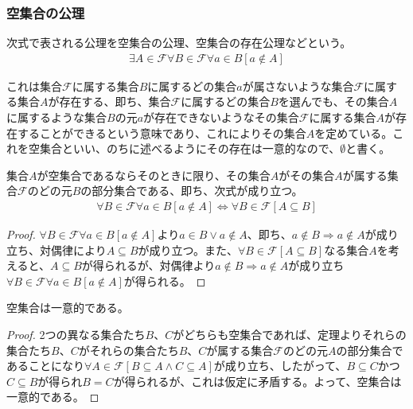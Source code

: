 \documentclass[a4paper]{jsarticle}
\begin{document}
\subsubsection{空集合の公理}%
\begin{axs}
次式で表される公理を空集合の公理、空集合の存在公理などという。
\begin{align*}
\exists A\in \mathcal{F}\forall B\in \mathcal{F} \forall a \in B[ a \notin A]
\end{align*}
\end{axs}
これは集合$\mathcal{F}$に属する集合$B$に属するどの集合$a$が属さないような集合$\mathcal{F}$に属する集合$A$が存在する、即ち、集合$\mathcal{F}$に属するどの集合$B$を選んでも、その集合$A$に属するような集合$B$の元$a$が存在できないようなその集合$\mathcal{F}$に属する集合$A$が存在することができるという意味であり、これによりその集合$A$を定めている。これを空集合といい、のちに述べるようにその存在は一意的なので、$\emptyset$と書く。
\begin{thm}
\label{1.2.1.1}
集合$A$が空集合であるならそのときに限り、その集合$A$がその集合$A$が属する集合$\mathcal{F}$のどの元$B$の部分集合である、即ち、次式が成り立つ。
\begin{align*}
\forall B\in \mathcal{F} \forall a \in B[ a \notin A] \Leftrightarrow \forall B\in \mathcal{F}[ A \subseteq B]
\end{align*}
\end{thm}
\begin{proof}
$\forall B\in \mathcal{F} \forall a \in B[ a \notin A]$より$a \in B \vee a \notin A$、即ち、$a \notin B \Rightarrow a \notin A$が成り立ち、対偶律により$A \subseteq B$が成り立つ。また、$\forall B\in \mathcal{F}[ A \subseteq B]$なる集合$A$を考えると、$A \subseteq B$が得られるが、対偶律より$a \notin B \Rightarrow a \notin A$が成り立ち$\forall B\in \mathcal{F} \forall a \in B[ a \notin A]$が得られる。
\end{proof}
\begin{thm}
\label{1.2.1.2}
空集合は一意的である。
\end{thm}
\begin{proof}
2つの異なる集合たち$B$、$C$がどちらも空集合であれば、定理よりそれらの集合たち$B$、$C$がそれらの集合たち$B$、$C$が属する集合$\mathcal{F}$のどの元$A$の部分集合であることになり$\forall A\in \mathcal{F}[ B \subseteq A \land C \subseteq A]$が成り立ち、したがって、$B \subseteq C$かつ$C \subseteq B$が得られ$B = C$が得られるが、これは仮定に矛盾する。よって、空集合は一意的である。
\end{proof}
\end{document}
